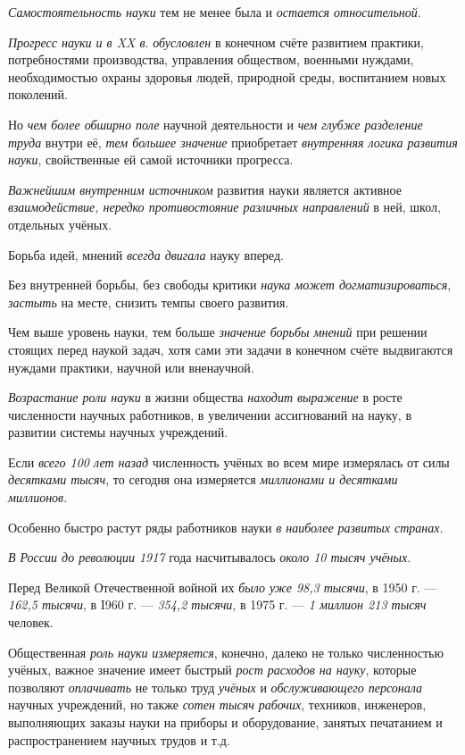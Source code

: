 \documentclass[a4paper,14pt,russian]{extreport}
\begin{document}
\emph{Самостоятельность науки} тем не менее была и \emph{остается относительной}.

\emph{Прогресс науки и в XX в}. \emph{обусловлен} в конечном счёте развитием практики, потребностями производства, управления обществом, военными нуждами, необходимостью охраны здоровья людей, природной среды, воспитанием новых поколений.

Но \emph{чем более обширно поле} научной деятельности и \emph{чем глубже разделение труда} внутри её, \emph{тем большее значение} приобретает \emph{внутренняя логика развития науки}, свойственные ей самой источники прогресса.

\emph{Важнейшим внутренним источником} развития науки является активное \emph{взаимодействие, нередко противостояние различных направлений} в ней, школ, отдельных учёных.

Борьба идей, мнений \emph{всегда двигала} науку вперед.

Без внутренней борьбы, без свободы критики \emph{наука может догматизироваться}, \emph{застыть} на месте, снизить темпы своего развития.

Чем выше уровень науки, тем больше \emph{значение борьбы мнений} при решении стоящих перед наукой задач, хотя сами эти задачи в конечном счёте выдвигаются нуждами практики, научной или вненаучной.

\emph{Возрастание роли науки} в жизни общества \emph{находит выражение} в росте численности научных работников, в увеличении ассигнований на науку, в развитии системы научных учреждений.

Если \emph{всего 100 лет назад} численность учёных во всем мире измерялась от силы \emph{десятками тысяч}, то сегодня она измеряется \emph{миллионами и десятками миллионов}.

Особенно быстро растут ряды работников науки \emph{в наиболее развитых странах}.

\emph{В России до революции 1917} года насчитывалось \emph{около 10 тысяч учёных}.

Перед Великой Отечественной войной их \emph{было уже 98,3 тысячи}, в 1950 г. --- \emph{162,5 тысячи}, в I960 г. --- \emph{354,2 тысячи}, в 1975 г. --- \emph{1 миллион 213 тысяч} человек.

Общественная \emph{роль науки} \emph{измеряется}, конечно, далеко не только численностью учёных, важное значение имеет быстрый \emph{рост расходов на науку}, которые позволяют \emph{оплачивать} не только труд \emph{учёных} и \emph{обслуживающего персонала} научных учреждений, но также \emph{сотен тысяч рабочих}, техников, инженеров, выполняющих заказы науки на приборы и оборудование, занятых печатанием и распространением научных трудов и т.д.
\end{document}
